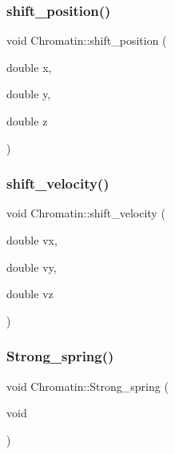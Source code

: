 \subsubsection{\texorpdfstring{shift\_position()}{shift\_position()}}
{\footnotesize\ttfamily void Chromatin\+::shift\+\_\+position (\begin{DoxyParamCaption}\item[{double}]{x,  }\item[{double}]{y,  }\item[{double}]{z }\end{DoxyParamCaption})\hspace{0.3cm}{\ttfamily [inline]}}

\mbox{\label{classChromatin_a49adafb5a81413b23a66f3a59d49d59c}} 
\subsubsection{\texorpdfstring{shift\_velocity()}{shift\_velocity()}}
{\footnotesize\ttfamily void Chromatin\+::shift\+\_\+velocity (\begin{DoxyParamCaption}\item[{double}]{vx,  }\item[{double}]{vy,  }\item[{double}]{vz }\end{DoxyParamCaption})\hspace{0.3cm}{\ttfamily [inline]}}

\mbox{\label{classChromatin_a9f8de53b9b39438ed966a9ad7cd5c962}} 
\subsubsection{\texorpdfstring{Strong\_spring()}{Strong\_spring()}}
{\footnotesize\ttfamily void Chromatin\+::\+Strong\+\_\+spring (\begin{DoxyParamCaption}\item[{void}]{ }\end{DoxyParamCaption})}

\mbox{\label{classChromatin_a0b9c6938baef5531ed325bc431e5636f}} 

